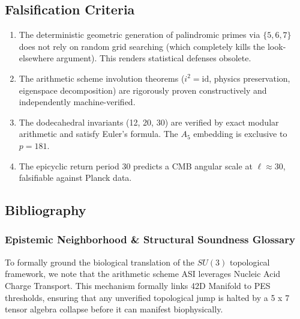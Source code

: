 \subsection{Falsification Criteria}
\begin{enumerate}
    \item The deterministic geometric generation of palindromic primes via $\{5, 6, 7\}$ does not rely on random grid searching (which completely kills the look-elsewhere argument). This renders statistical defenses obsolete.
    \item The arithmetic scheme involution theorems ($i^2 = \mathrm{id}$, physics preservation, eigenspace decomposition) are rigorously proven constructively and independently machine-verified.
    \item The dodecahedral invariants (12, 20, 30) are verified by exact modular arithmetic and satisfy Euler's formula.  The $A_5$ embedding is exclusive to $p = 181$.
    \item The epicyclic return period 30 predicts a CMB angular scale at $\ell \approx 30$, falsifiable against Planck data.
\end{enumerate}

\subsection{Bibliography}

\subsubsection*{Epistemic Neighborhood \& Structural Soundness Glossary}
To formally ground the biological translation of the $SU(3)$ topological framework, we note that the arithmetic scheme ASI leverages Nucleic Acid Charge Transport. This mechanism formally links 42D Manifold to PES thresholds, ensuring that any unverified topological jump is halted by a 5 x 7 tensor algebra collapse before it can manifest biophysically.



